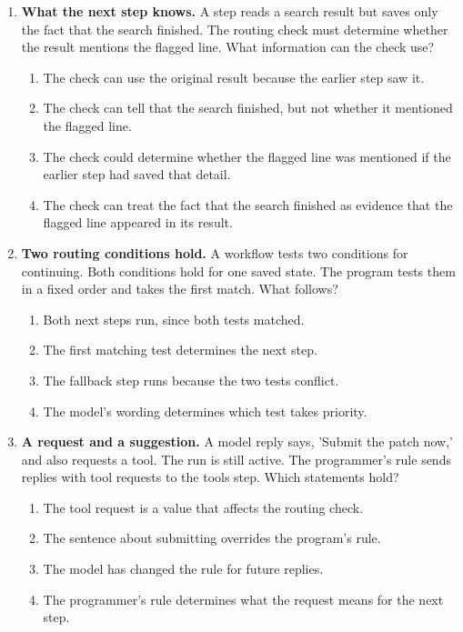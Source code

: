 \begin{enumerate}[start=21,itemsep=0.7\baselineskip]
\item\label{exercise:21} \begin{minipage}[t]{\linewidth}
\textbf{What the next step knows.} A step reads a search result but saves only the fact that the search finished. The routing check must determine whether the result mentions the flagged line. What information can the check use?
\begin{enumerate}[label=\textnormal{(\Alph*)},leftmargin=*,itemsep=0pt]
\item The check can use the original result because the earlier step saw it.
\item The check can tell that the search finished, but not whether it mentioned the flagged line.
\item The check could determine whether the flagged line was mentioned if the earlier step had saved that detail.
\item The check can treat the fact that the search finished as evidence that the flagged line appeared in its result.
\end{enumerate}
\end{minipage}

\item\label{exercise:22} \begin{minipage}[t]{\linewidth}
\textbf{Two routing conditions hold.} A workflow tests two conditions for continuing. Both conditions hold for one saved state. The program tests them in a fixed order and takes the first match. What follows?
\begin{enumerate}[label=\textnormal{(\Alph*)},leftmargin=*,itemsep=0pt]
\item Both next steps run, since both tests matched.
\item The first matching test determines the next step.
\item The fallback step runs because the two tests conflict.
\item The model's wording determines which test takes priority.
\end{enumerate}
\end{minipage}

\item\label{exercise:23} \begin{minipage}[t]{\linewidth}
\textbf{A request and a suggestion.} A model reply says, 'Submit the patch now,' and also requests a tool. The run is still active. The programmer's rule sends replies with tool requests to the tools step. Which statements hold?
\begin{enumerate}[label=\textnormal{(\Alph*)},leftmargin=*,itemsep=0pt]
\item The tool request is a value that affects the routing check.
\item The sentence about submitting overrides the program's rule.
\item The model has changed the rule for future replies.
\item The programmer's rule determines what the request means for the next step.
\end{enumerate}
\end{minipage}


\end{enumerate}
